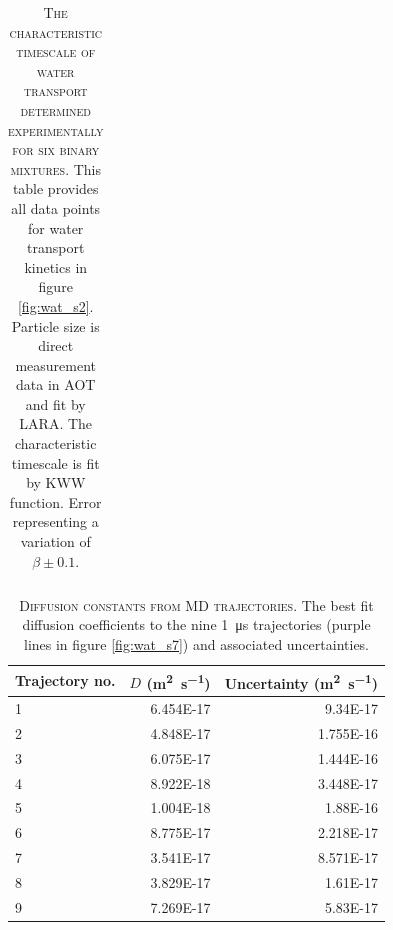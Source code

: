 \begin{xltabular}{0.9\textwidth}{YYYYYY}
    \caption[The characteristic timescale of water transport determined experimentally for six binary mixtures]{\textsc{The characteristic timescale of water transport determined experimentally for six binary mixtures}. This table provides all data points for water transport kinetics in figure \ref{fig:wat_s2}. Particle size is direct measurement data in AOT and fit by LARA. The characteristic timescale is fit by KWW function. Error representing a variation of $\beta \pm 0.1.$} \label{tab:wat_s1}
\end{xltabular}

\clearpage

\begin{table}
    \centering
    \begin{tabular}{lrr}
    \toprule
    Trajectory no. & $D$ (\si{\meter\squared\per\second}) & Uncertainty  (\si{\meter\squared\per\second})  \\
    \midrule
    1 &	6.454E-17	& 9.34E-17 \\
    2 &	4.848E-17	& 1.755E-16 \\
    3 &	6.075E-17	& 1.444E-16 \\
    4 &	8.922E-18	& 3.448E-17 \\
    5 &	1.004E-18	& 1.88E-16 \\
    6 &	8.775E-17	& 2.218E-17 \\
    7 &	3.541E-17	& 8.571E-17 \\
    8 &	3.829E-17	& 1.61E-17 \\
    9 &	7.269E-17	& 5.83E-17 \\
    \bottomrule
    \end{tabular}
    \caption[Diffusion constants from MD trajectories]{\textsc{Diffusion constants from MD trajectories}. The best fit diffusion coefficients to the nine \SI{1}{\micro\second} trajectories (purple lines in figure \ref{fig:wat_s7}) and associated uncertainties.}
    \label{tab:wat_s2}
\end{table}

